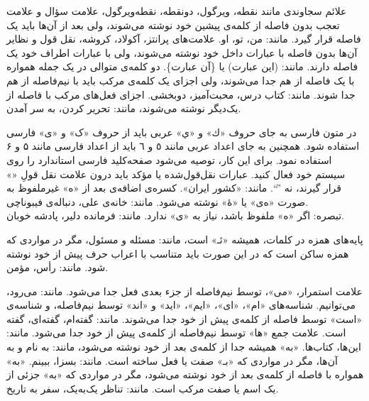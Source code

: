 

علائم سجاوندی مانند نقطه، ویرگول، دونقطه، نقطه‌ویرگول، علامت سؤال و علامت تعجب %
بدون فاصله از کلمه‌ی پیشین خود نوشته می‌شوند، ولی بعد از آن‌ها باید یک فاصله‌ قرار گیرد. مانند: من، تو، او.
علامت‌های پرانتز، آکولاد، کروشه، نقل قول و نظایر آن‌ها بدون فاصله با عبارات داخل خود نوشته می‌شوند، ولی با عبارات اطراف خود یک فاصله دارند. مانند: (این عبارت) یا \{آن عبارت\}.
دو کلمه‌ی متوالی در یک جمله همواره با یک فاصله از هم جدا می‌شوند، ولی اجزای یک کلمه‌ی مرکب باید با نیم‌فاصله‌‌
 از هم جدا شوند. مانند: کتاب درس، محبت‌آمیز، دوبخشی.
 اجزای فعل‌های مرکب با فاصله از یک‌دیگر نوشته می‌شوند، مانند: تحریر کردن، به سر آمدن.




در متون فارسی به جای حروف «ك» و «ي» عربی باید از حروف «ک» و «ی» فارسی استفاده شود. همچنین به جای اعداد عربی مانند ٥ و ٦ باید از اعداد فارسی مانند ۵ و ۶ استفاده نمود. 
برای این کار، توصیه می‌شود صفحه‌کلید‌ فارسی استاندارد را روی سیستم خود فعال کنید.
عبارات نقل‌قول‌شده یا مؤکد باید درون علامت نقل قولِ «» قرار گیرند، نه ''``. مانند: «کشور ایران».
کسره‌ی اضافه‌ی بعد از «ه» غیرملفوظ به صورت «ه‌ی» یا «هٔ» نوشته می‌شود. مانند: خانه‌ی علی، دنباله‌ی فیبوناچی.
\\
تبصره‌: اگر «ه» ملفوظ باشد، نیاز به «‌ی» ندارد. مانند: فرمانده دلیر، پادشه خوبان. 

پایه‌های همزه در کلمات، همیشه «ئـ» است، مانند: مسئله و مسئول، مگر در مواردی که همزه ساکن است که در این ‌صورت باید متناسب با اعراب حرف پیش از خود نوشته شود. مانند: رأس، مؤمن. 






علامت استمرار، «می»، توسط نیم‌فاصله از جزء‌ بعدی فعل جدا می‌شود. مانند: می‌رود، می‌توانیم.
شناسه‌های «ام»، «ای»، «ایم»، «اید» و «اند» توسط نیم‌فاصله، و شناسه‌ی «است» توسط فاصله از کلمه‌ی پیش از خود جدا می‌شوند. مانند: گفته‌ام، گفته‌ای، گفته است.
علامت جمع «ها» توسط نیم‌فاصله از کلمه‌ی پیش از خود جدا می‌شود. مانند: این‌ها، کتاب‌ها.
«به» همیشه جدا از کلمه‌ی بعد از خود نوشته می‌شود، مانند: به‌ نام و به آن‌ها، مگر در مواردی که «بـ» صفت یا فعل ساخته است. مانند: بسزا، ببینم.
«به» همواره با فاصله از کلمه‌ی بعد از خود نوشته می‌شود، مگر در مواردی که «به» جزئی از یک اسم یا صفت مرکب است. مانند: تناظر یک‌به‌یک، سفر به تاریخ. 
%
%
%

